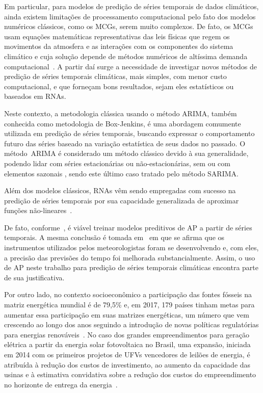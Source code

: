 \documentclass[a4paper]{ifacconf}
\begin{document}
Em particular, para modelos de predição de séries temporais de dados climáticos, ainda existem limitações de processamento computacional pelo fato dos modelos numéricos clássicos, como os \acp{MCG}, serem muito complexos. De fato, os \acp{MCG} usam equações matemáticas representativas das leis físicas que regem os movimentos da atmosfera e as interações com os componentes do sistema climático e cuja solução depende de métodos numéricos de altíssima demanda computacional~\citep{Escobar2007, Sampaio2014}. A partir daí surge a necessidade de investigar novos métodos de predição de séries temporais climáticas, mais simples, com menor custo computacional, e que forneçam bons resultados, sejam eles estatísticos ou baseados em \acp{RNA}.

Neste contexto, a metodologia clássica usando o método \ac{ARIMA}, também conhecida como metodologia de Box-Jenkins, é uma abordagem comumente utilizada em predição de séries temporais, buscando expressar o comportamento futuro das séries baseado na variação estatística de seus dados no passado. O método~\ac{ARIMA} é considerado um método clássico devido à sua generalidade, podendo lidar com séries estacionárias ou não-estacionárias, sem ou com elementos sazonais \cite{Babai2013, Maddala2003}, sendo este último caso tratado pelo método \ac{SARIMA}.

Além dos modelos clássicos, \acp{RNA} vêm sendo empregadas com sucesso na predição de séries temporais por sua capacidade generalizada de aproximar funções não-lineares~\citep{Fernandes1996,Caloba2002,TorresJr2005}.

De fato, conforme~\cite{Mourao2019, Teixeira2019, Pereira2017, Ghaderi2017, Grover2015}, é viável treinar modelos preditivos de \ac{AP} a partir de séries temporais. A mesma conclusão é tomada em~\cite{Santos2013} em que se afirma que os instrumentos utilizados pelos meteorologistas foram se desenvolvendo e, com eles, a precisão das previsões do tempo foi melhorada substancialmente. Assim, o uso de \ac{AP} neste trabalho para predição de séries temporais climáticas encontra parte de sua justificativa.

Por outro lado, no contexto socioeconômico a participação das fontes fósseis na matriz energética mundial é de 79,5\% e, em 2017, 179 países tinham metas para aumentar essa participação em suas matrizes energéticas, um número que vem crescendo ao longo dos anos seguindo a introdução de novas políticas regulatórias para energias renováveis~\citep{Ren2018}. No caso dos grandes empreendimentos para geração elétrica a partir da energia solar fotovoltaica no Brasil, uma expansão, iniciada em 2014 com os primeiros projetos de \acp{UFV} vencedores de leilões de energia, é atribuída à redução dos custos de investimento, ao aumento da capacidade das usinas e à estimativa convidativa sobre a redução dos custos do empreendimento no horizonte de entrega da energia~\citep{Epe2018}.
\end{document}
